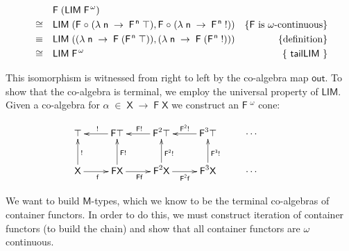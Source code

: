 \documentclass[a4paper]{article}
\newcommand{\Conid}[1]{\mathit{#1}}
\newcommand{\Varid}[1]{\mathit{#1}}
\renewcommand\Varid[1]{\mathord{\textsf{#1}}}
\let\Conid\Varid
\begin{document}
\begin{align*}
&&& \ensuremath{\Conid{F}\;(\Conid{LIM}\;\Conid{F}\;\!^{\omega})} & \\
&\cong&& \ensuremath{\Conid{LIM}\;(\Conid{F}\;\ensuremath{\mbox{$\circ$}}\;(\lambda\;\Varid{n}\;\rightarrow\;\Conid{F}\;\!^{\Varid{n}}\;\top),\Conid{F}\;\ensuremath{\mbox{$\circ$}}\;(\lambda\;\Varid{n}\;\rightarrow\;\Conid{F}\;\!^{\Varid{n}}\;\mathbin{!}))} & \{\mbox{\ensuremath{\Conid{F}} is $\omega$-continuous}\} \\
&\equiv&& \ensuremath{\Conid{LIM}\;((\lambda\;\Varid{n}\;\rightarrow\;\Conid{F}\;(\Conid{F}\;\!^{\Varid{n}}\;\top)),(\lambda\;\Varid{n}\;\rightarrow\;\Conid{F}\;(\Conid{F}\;\!^{\Varid{n}}\;\mathbin{!})))} & \{\mbox{definition}\}\\
&\cong&& \ensuremath{\Conid{LIM}\;\Conid{F}\;\!^{\omega}} & \{\mbox{ \ensuremath{\Varid{tailLIM}} }\} \\
\end{align*}


This isomorphism is witnessed from right to left by the co-algebra map \ensuremath{\Varid{out}}.
To show that the co-algebra is terminal, we employ the universal property of
\ensuremath{\Conid{LIM}}. Given a co-algebra for \ensuremath{\alpha\;\in\;\Conid{X}\;\rightarrow\;\Conid{F}\;\Conid{X}} we construct an \ensuremath{\Conid{F}\;\!^{\omega}} cone:

\[
\xymatrix{
\ensuremath{\top} &
\ar[l]_{\ensuremath{\mathbin{!}}}
\ensuremath{\Conid{F}} \ensuremath{\top} &
\ar[l]_{\ensuremath{\Conid{F}} \ensuremath{\mathbin{!}}}
\ensuremath{\Conid{F}}^{2} \ensuremath{\top} &
\ar[l]_{\ensuremath{\Conid{F}}^{\ensuremath{\Varid{2}}} \ensuremath{\mathbin{!}}}
\ensuremath{\Conid{F}}^{3} \ensuremath{\top} &
\cdots & \\
\ensuremath{\Conid{X}} 
\ar[u]_{\ensuremath{\mathbin{!}}}
\ar[r]_{\ensuremath{\Varid{f}}} &
\ensuremath{\Conid{F}} \ensuremath{\Conid{X}} 
\ar[u]_{\ensuremath{\Conid{F}} \ensuremath{\mathbin{!}}}
\ar[r]_{\ensuremath{\Conid{F}} \ensuremath{\Varid{f}}} &
\ensuremath{\Conid{F}}^{2} \ensuremath{\Conid{X}}
\ar[u]_{\ensuremath{\Conid{F}}^{\ensuremath{\Varid{2}}} \ensuremath{\mathbin{!}}} 
\ar[r]_{\ensuremath{\Conid{F}}^{\ensuremath{\Varid{2}}} \ensuremath{\Varid{f}}} &
\ensuremath{\Conid{F}}^{3} \ensuremath{\Conid{X}}
\ar[u]_{\ensuremath{\Conid{F}}^{\ensuremath{\Varid{3}}} \ensuremath{\mathbin{!}}} 
 &
\cdots \\
}
\]

We want to build \ensuremath{\Conid{M}}-types, which we know to be the terminal co-algebras of 
container functors. In order to do this, we must construct 
iteration of container functors (to build the chain) and show that all container
functors are $\omega$ continuous.
\end{document}
